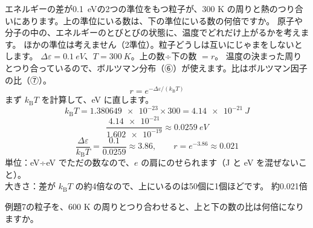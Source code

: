 \label{ph:熱-15:ex7}
\begin{phreidai}[2つの準位の数の比]
エネルギーの差が\qty{0.1}{eV}の2つの準位をもつ粒子が、300 K の周りと熱のつり合いにあります。上の準位にいる数は、下の準位にいる数の何倍ですか。
\phbamen
原子や分子の中の、エネルギーのとびとびの状態に、温度でどれだけ上がるかを考えます。
\phmushi
ほかの準位は考えません（2準位）。粒子どうしは互いにじゃまをしないとします。
\phzu
$\Delta\varepsilon=\qty{0.1}{eV}$、$T=\qty{300}{K}$。上の数÷下の数 $=r$。
\phriyu
温度の決まった周りとつり合っているので、ボルツマン分布（⑥）が使えます。比はボルツマン因子の比（⑦）。
\phtateru
\[r=e^{-\Delta\varepsilon/(k_{\mathrm B}T)}\]
\phtoku
まず $k_{\mathrm B}T$ を計算して、eV に直します。
\[k_{\mathrm B}T=\num{1.380649e-23}\times300=\qty{4.14e-21}{J}\]
\[\frac{\num{4.14e-21}}{\num{1.602e-19}}\approx\qty{0.0259}{eV}\]
\[\frac{\Delta\varepsilon}{k_{\mathrm B}T}=\frac{0.1}{0.0259}\approx3.86,\qquad r=e^{-3.86}\approx0.021\]
\phtashikame
単位：eV÷eV でただの数なので、$e$ の肩にのせられます（J と eV を混ぜないこと）。\\
大きさ：差が $k_{\mathrm B}T$ の約4倍なので、上にいるのは50個に1個ほどです。
\kotae 約0.021倍
\end{phreidai}
\begin{jibun}
例題7の粒子を、600 K の周りとつり合わせると、上と下の数の比は何倍になりますか。
\end{jibun}

